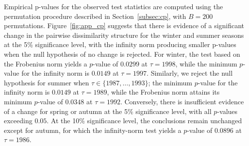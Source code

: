 \documentclass[APA,STIX1COL]{WileyNJD-v2}
\begin{document}
Empirical p-values for the observed test statistics are computed using the permutation procedure described in Section~\ref{subsec:cp}, with $B=200$ permutations. Figure~\ref{fig:app_cp} suggests that there is evidence of a significant change in the pairwise dissimilarity structure for the winter and summer seasons at the 5\% significance level, with the infinity norm producing smaller p-values when the null hypothesis of no change is rejected. 
For winter, the test based on the Frobenius norm yields a $p$-value of $0.0299$ at $\tau=1998$, while the minimum $p$-value for the infinity norm is $0.0149$ at $\tau=1997$. 
Similarly, we reject the null hypothesis for summer when $\tau\in\{1987,\ldots,1993\}$; the minimum $p$-value for the infinity norm is $0.0149$ at $\tau=1989$, while the Frobenius norm attains its minimum $p$-value of $0.0348$ at $\tau=1992$. 
Conversely, there is insufficient evidence of a change for spring or autumn at the 5\% significance level, with all $p$-values exceeding $0.05$. 
At the 10\% significance level, the conclusions remain unchanged except for autumn, for which the infinity-norm test yields a $p$-value of $0.0896$ at $\tau=1986$.

\end{document}
